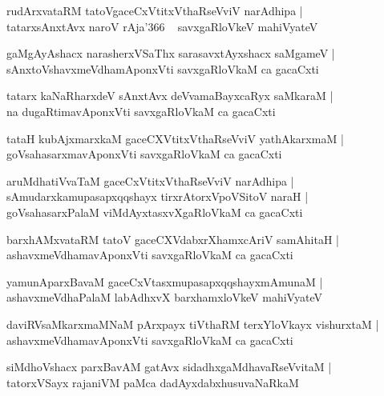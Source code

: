 \documentclass[twoside,12pt,openright]{book}
\newcounter{shloka}[chapter]
\begin{document}
\begin{shloka}
rudArxvataRM tatoVgaceCxVtitxVthaRseVviV narAdhipa |\\
tatarxsAnxtAvx naroV rAja\char'366 ~ savxgaRloVkeV mahiVyateV 
\end{shloka}

\begin{shloka}
gaMgAyAshacx narasherxVSaThx sarasavxtAyxshacx saMgameV |\\
sAnxtoVshavxmeVdhamAponxVti savxgaRloVkaM ca gacaCxti 
\end{shloka}

\begin{shloka}
tatarx kaNaRharxdeV sAnxtAvx deVvamaBayxcaRyx saMkaraM |\\
na dugaRtimavAponxVti savxgaRloVkaM ca gacaCxti 
\end{shloka}

\begin{shloka}
tataH kubAjxmarxkaM gaceCXVtitxVthaRseVviV yathAkarxmaM |\\
goVsahasarxmavAponxVti savxgaRloVkaM ca gacaCxti 
\end{shloka}

\begin{shloka}
aruMdhatiVvaTaM gaceCxVtitxVthaRseVviV narAdhipa |\\
sAmudarxkamupasapxqqshayx tirxrAtorxVpoVSitoV naraH |\\
goVsahasarxPalaM viMdAyxtasxvXgaRloVkaM ca gacaCxti 
\end{shloka}

\begin{shloka}
barxhAMxvataRM tatoV gaceCXVdabxrXhamxcAriV samAhitaH |\\
ashavxmeVdhamavAponxVti savxgaRloVkaM ca gacaCxti 
\end{shloka}

\begin{shloka}
yamunAparxBavaM gaceCxVtasxmupasapxqqshayxmAmunaM |\\
ashavxmeVdhaPalaM labAdhxvX barxhamxloVkeV mahiVyateV
\end{shloka}

\begin{shloka}
daviRVsaMkarxmaMNaM pArxpayx tiVthaRM terxYloVkayx vishurxtaM |\\
ashavxmeVdhamavAponxVti savxgaRloVkaM ca gacaCxti 
\end{shloka}

\begin{shloka}
siMdhoVshacx parxBavAM gatAvx sidadhxgaMdhavaRseVvitaM |\\
tatorxVSayx rajaniVM paMca dadAyxdabxhusuvaNaRkaM 
\end{shloka}
\end{document}
